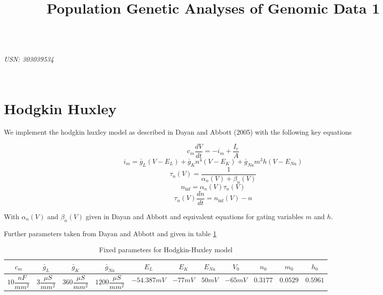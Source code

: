 \documentclass{article}
\title{Population Genetic Analyses of Genomic Data 1}
\begin{document}

\begin{center}
\textbf{\Large{}}\\
\textit{USN: 303039534}\\
\end{center}

~\\


\section{Hodgkin Huxley}

We implement the hodgkin huxley model as described in Dayan and Abbott (2005) with the following key equations



\begin{equation}
c_m \dfrac{dV}{dt} = -i_m + \dfrac{I_e}{A}
\end{equation}
\begin{equation}
i_m = \bar g_L(V-E_L)+ \bar g_Kn^4(V-E_K)+ \bar g_{Na}m^3h(V-E_{Na})
\end{equation}
\begin{equation}
\tau_n(V) = \dfrac{1}{\alpha_n(V) + \beta_n(V)}
\end{equation}
\begin{equation}
n_{\inf} = \alpha_n(V)\tau_n(V)
\end{equation}
\begin{equation}
\tau_n(V)\dfrac{dn}{dt}=n_{\inf}(V)-n
\end{equation}

With $\alpha_n(V)$ and $\beta_n(V)$ given in Dayan and Abbott and equivalent equations for gating variables $m$ and $h$.

Further parameters taken from Dayan and Abbott and given in table \ref{tab:params}

\begin{table}[h]
\centering
\begin{tabular}{ |c|c|c|c|c|c|c|c|c|c|c|}
\hline
 $c_m$ &  $\bar g_L$ & $\bar g_K$ & $\bar g_{Na}$ & $E_L$ & $E_K$ & $E_{Na}$ & $V_0$ & $n_0$ & $m_0$ & $h_0$ \\
\hline
$10 \dfrac{nF}{mm^2}$ & $ 3\dfrac{\mu S}{mm^2} $ & $ 360\dfrac{\mu S}{mm^2} $& $ 1200\dfrac{\mu S}{mm^2} $& $-54.387 mV$ & $-77 mV$ & $50 mV$ & $-65 mV$ & $0.3177$ & $0.0529$ & $0.5961$ \\
\hline
\end{tabular}
\caption{Fixed parameters for Hodgkin-Huxley model}
\label{tab:params}
\end{table}
\end{document}
